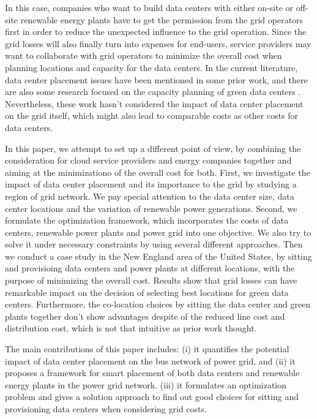In this case, companies who want to build data centers with either on-site or off-site renewable energy plants have to get the permission from the grid operators first in order to reduce the unexpected influence to the grid operation. Since the grid losses will also finally turn into expenses for end-users, service providers may want to collaborate with grid operators to minimize the overall cost when planning locations and capacity for the data centers. In the current literature, data center placement issues have been mentioned in some prior work\cite{Goiri11place,Dalger05,Boley09,larumbe2012optimal}, and there are also some research focused on the capacity planning of green data centers \cite{Le10,berral2014building}. Nevertheless, these work hasn't considered the impact of data center placement on the grid itself, which might also lead to comparable costs as other costs for data centers.

In this paper, we attempt to set up a different point of view, by combining the consideration for cloud service providers and energy companies together and aiming at the minimizationo of the overall cost for both. First, we investigate the impact of data center placement and its importance to the grid by studying a region of grid network. We pay special attention to the data center size, data center locations and the variation of renewable power generations. Second, we formulate the optimization framework, which incorporates the costs of data centers, renewable power plants and power grid into one objective. We also try to solve it under necessary constraints by using several different approaches. Then we conduct a case study in the New England area of the United States, by sitting and provisioing data centers and power plants at different locations, with the purpose of minimizing the overall cost. Results show that grid losses can have remarkable impact on the decision of selecting best locations for green data centers. Furthermore, the co-location choices by sitting the data center and green plants together don't show advantages despite of the reduced line cost and distribution cost, which is not that intuitive as prior work thought.

 The main contributions of this paper includes: (i) it quantifies the potential impact of data center placement on the bus network of power grid, and (ii) it proposes a framework for smart placement of both data centers and renewable energy plants in the power grid network. (iii) it formulates an optimization problem and gives a solution approach to find out good choices for sitting and provisioning data centers when considering grid costs. 

